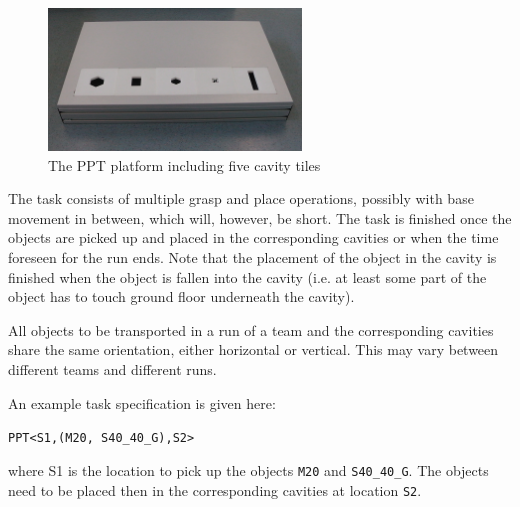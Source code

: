 \begin{figure}
\centering
\includegraphics[width=0.6\textwidth ]{../images/ppt_plattform.jpg}
\caption{The PPT platform including five cavity tiles}
\label{fig:ppt_plattform}
\end{figure}

The task consists of multiple grasp and place operations, possibly with base movement in between, which will, however, be short. The task is finished once the objects are picked up and placed in the corresponding cavities or when the time foreseen for the run ends. Note that the placement of the object in the cavity is finished when the object is fallen into the cavity (i.e. at least some part of the object has to touch ground floor underneath the cavity).
\par
All objects to be transported in a run of a team and the corresponding cavities share the same orientation, either horizontal or vertical. This may vary between different teams and different runs.
\par
An example task specification is given here:
\begin{center}
\texttt{PPT\textless S1,(M20, S40\_40\_G),S2\textgreater}
\end{center}
where S1 is the location to pick up the objects \texttt{M20} and \texttt{S40\_40\_G}. The objects need to be placed then in the corresponding cavities at location \texttt{S2}.
%
%
%

